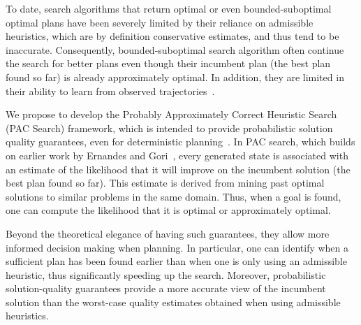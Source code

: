 \documentclass[12pt]{article}
\begin{document}
To date, search algorithms that return optimal or even bounded-suboptimal optimal plans have been severely limited by their reliance on admissible heuristics, which are by definition conservative estimates, and thus tend to be inaccurate. Consequently, bounded-suboptimal search algorithm often continue the search for better plans even though their incumbent plan (the best plan found so far) is already approximately optimal. In addition, they are limited in their ability to learn from observed trajectories~\cite{thayer2011bounded,phillips2012graphs}.



We propose to develop the Probably Approximately Correct Heuristic Search (PAC Search) framework, which is intended to provide probabilistic solution quality guarantees, even for deterministic planning~\cite{stern2011probably,stern2012search}. In PAC search, which builds on earlier work by Ernandes and Gori~\cite{ernandes2004likely}, every generated state is associated with an estimate of the likelihood that it will improve on the incumbent solution (the best plan found so far). This estimate is derived from mining past optimal solutions to similar problems in the same domain. Thus, when a goal is found, one can compute the likelihood that it is optimal or approximately optimal. 


Beyond the theoretical elegance of having such guarantees, they allow more informed decision making when planning. In particular, one can identify when a sufficient plan has been found earlier than when one is only using an admissible heuristic, thus significantly speeding up the search. Moreover, probabilistic solution-quality guarantees provide a more accurate view of the incumbent solution than the worst-case quality estimates obtained when using admissible heuristics. 


\end{document}
